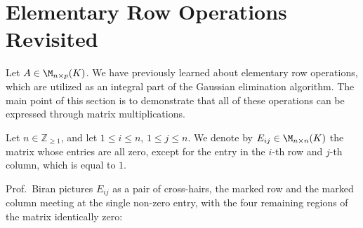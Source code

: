 \renewcommand{\thetheorem}{17.e.\arabic{theorem}}
\setcounter{theorem}{0}


\section{Elementary Row Operations Revisited}
\label{sec:eros_revisited}

Let $A \in \M_{n \times p}(K)$. We have previously learned about elementary row operations, which are utilized as an integral part of the Gaussian elimination algorithm. The main point of this section is to demonstrate that all of these operations can be expressed through matrix multiplications.

\begin{notation}
\label{not:matrix_units}
Let $n \in \mathbb{Z}_{\ge 1}$, and let $1 \le i \le n$, $1 \le j \le n$. We denote by $E_{ij} \in \M_{n \times n}(K)$ the matrix whose entries are all zero, except for the entry in the $i$-th row and $j$-th column, which is equal to $1$.
\end{notation}

Prof.~Biran pictures $E_{ij}$ as a pair of cross-hairs, the marked row and the marked column meeting at the single non-zero entry, with the four remaining regions of the matrix identically zero:

